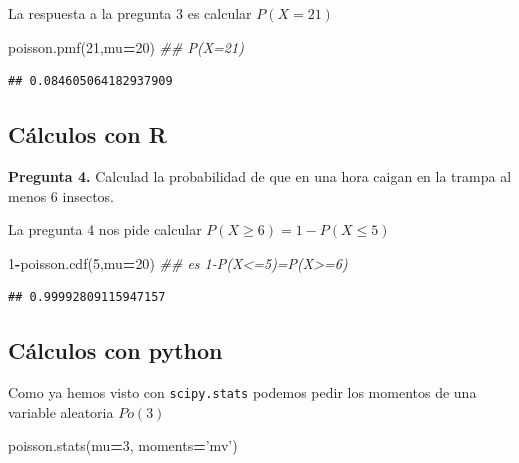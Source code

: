 \documentclass[]{book}
\newenvironment{Shaded}{\begin{snugshade}}{\end{snugshade}}
\newcommand{\CommentTok}[1]{\textcolor[rgb]{0.56,0.35,0.01}{\textit{#1}}}
\newcommand{\DecValTok}[1]{\textcolor[rgb]{0.00,0.00,0.81}{#1}}
\newcommand{\NormalTok}[1]{#1}
\newcommand{\OperatorTok}[1]{\textcolor[rgb]{0.81,0.36,0.00}{\textbf{#1}}}
\newcommand{\StringTok}[1]{\textcolor[rgb]{0.31,0.60,0.02}{#1}}
\begin{document}
La respuesta a la pregunta 3 es calcular \(P(X=21)\)

\begin{Shaded}
\begin{Highlighting}[]
\NormalTok{poisson.pmf(}\DecValTok{21}\NormalTok{,mu}\OperatorTok{=}\DecValTok{20}\NormalTok{)}
\CommentTok{## P(X=21)}
\end{Highlighting}
\end{Shaded}

\begin{verbatim}
## 0.084605064182937909
\end{verbatim}

\hypertarget{cuxe1lculos-con-r-9}{%
\subsection{Cálculos con R}\label{cuxe1lculos-con-r-9}}

\textbf{Pregunta 4.} Calculad la probabilidad de que en una hora caigan en la trampa al menos 6 insectos.

La pregunta 4 nos pide calcular \(P(X\geq 6)=1-P(X\leq 5)\)

\begin{Shaded}
\begin{Highlighting}[]
\DecValTok{1}\OperatorTok{-}\NormalTok{poisson.cdf(}\DecValTok{5}\NormalTok{,mu}\OperatorTok{=}\DecValTok{20}\NormalTok{) }
\CommentTok{## es 1-P(X<=5)=P(X>=6)}
\end{Highlighting}
\end{Shaded}

\begin{verbatim}
## 0.99992809115947157
\end{verbatim}

\hypertarget{cuxe1lculos-con-python-10}{%
\subsection{Cálculos con python}\label{cuxe1lculos-con-python-10}}

Como ya hemos visto con \texttt{scipy.stats} podemos pedir los momentos de una variable aleatoria
\(Po(3)\)

\begin{Shaded}
\begin{Highlighting}[]
\NormalTok{poisson.stats(mu}\OperatorTok{=}\DecValTok{3}\NormalTok{, moments}\OperatorTok{=}\StringTok{'mv'}\NormalTok{)}
\end{Highlighting}
\end{Shaded}
\end{document}
